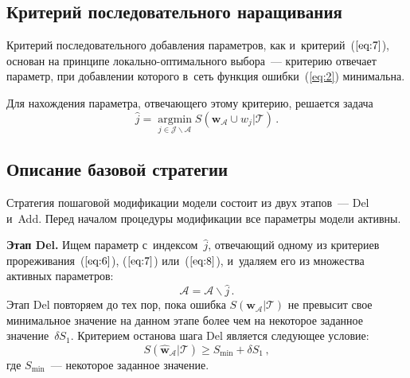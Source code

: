 \begin{multicols}{2}
\subsection{Критерий последовательного наращивания}

Критерий последовательного добавления параметров, как
и~критерий~($\ref{eq:7}$), основан на принципе ло\-каль\-но-опти\-маль\-но\-го
выбора~--- критерию отвечает параметр, при добавлении которого
в~сеть функция ошибки~(\ref{eq:2}) минимальна.

Для нахождения параметра, отвечающего этому критерию, решается задача
\begin{equation*}
\hat{j} = \mathop{\text{argmin}}\limits_{{j \in \mathcal{J} \backslash \mathcal{A}}}S(\mathbf{w}_{\mathcal{A}} \cup {w_j}|\mathcal{T})\,.
\end{equation*}

\subsection{Описание базовой стратегии}

Стратегия пошаговой модификации модели состоит из двух этапов~--- Del
и~Add. Перед началом процедуры модификации все параметры модели активны.

\textbf{Этап Del.} Ищем параметр с~индексом~$\hat{j}$, отвечающий одному
из критериев прореживания~($\ref{eq:6}$), ($\ref{eq:7}$) или~($\ref{eq:8}$),
и~удаляем его из множества активных параметров:
\begin{equation*}
\mathcal{A} = \mathcal{A} \backslash \hat{j}\,.
\end{equation*}
Этап Del повторяем до тех пор, пока ошибка
$S(\mathbf{w}_{\mathcal{A}}|\mathcal{T})$ не превысит свое
минимальное значение на данном этапе более чем на некоторое заданное
значение~$\delta S_1$. Критерием останова шага Del является
следующее условие:
\begin{equation}
\label{eq:11}
S(\mathbf{\hat{w}}_{\mathcal{A}}|\mathcal{T}) \geq S_{\min} + \delta S_1\,,
\end{equation}
где $S_{\min}$~--- некоторое заданное значение.


\end{multicols}
